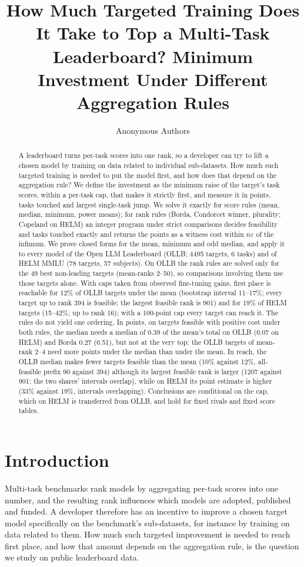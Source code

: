 \documentclass{article}
\title{How Much Targeted Training Does It Take to Top a Multi-Task Leaderboard? Minimum Investment Under Different Aggregation Rules}
\author{Anonymous Authors}
\begin{document}
\maketitle

\begin{abstract}
A leaderboard turns per-task scores into one rank, so a developer can try to lift a chosen model by training on data related to individual sub-datasets. How much such targeted training is needed to put the model first, and how does that depend on the aggregation rule? We define the investment as the minimum raise of the target's task scores, within a per-task cap, that makes it strictly first, and measure it in points, tasks touched and largest single-task jump. We solve it exactly for score rules (mean, median, minimum, power means); for rank rules (Borda, Condorcet winner, plurality; Copeland on HELM) an integer program under strict comparisons decides feasibility and tasks touched exactly and returns the points as a witness cost within $n\varepsilon$ of the infimum. We prove closed forms for the mean, minimum and odd median, and apply it to every model of the Open LLM Leaderboard (OLLB; 4495 targets, 6 tasks) and of HELM MMLU (78 targets, 57 subjects). On OLLB the rank rules are solved only for the 49 best non-leading targets (mean-ranks 2--50), so comparisons involving them use those targets alone. With caps taken from observed fine-tuning gains, first place is reachable for 12\% of OLLB targets under the mean (bootstrap interval 11--17\%; every target up to rank 394 is feasible; the largest feasible rank is 901) and for 19\% of HELM targets (15--42\%; up to rank 16); with a 100-point cap every target can reach it. The rules do not yield one ordering. In points, on targets feasible with positive cost under both rules, the median needs a median of 0.39 of the mean's total on OLLB (0.07 on HELM) and Borda 0.27 (0.51), but not at the very top: the OLLB targets of mean-rank 2--4 need more points under the median than under the mean. In reach, the OLLB median makes fewer targets feasible than the mean (10\% against 12\%, all-feasible prefix 90 against 394) although its largest feasible rank is larger (1207 against 901; the two shares' intervals overlap), while on HELM its point estimate is higher (33\% against 19\%, intervals overlapping). Conclusions are conditional on the cap, which on HELM is transferred from OLLB, and hold for fixed rivals and fixed score tables.
\end{abstract}

\section{Introduction}
\label{sec:intro}
Multi-task benchmarks rank models by aggregating per-task scores into one number, and the resulting rank influences which models are adopted, published and funded. A developer therefore has an incentive to improve a chosen target model specifically on the benchmark's sub-datasets, for instance by training on data related to them. How much such targeted improvement is needed to reach first place, and how that amount depends on the aggregation rule, is the question we study on public leaderboard data.
\end{document}
